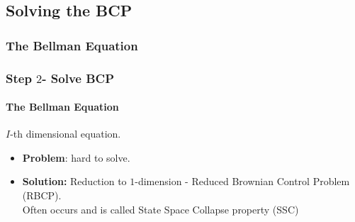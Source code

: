 \documentclass{beamer}
\begin{document}
\begin{frame}
{\begin{definition}
\begin{enumerate}
      \end{enumerate}
    \end{definition}
    
  }
  \vfill
\end{frame}
\subsection{Solving the BCP}

\subsubsection{The Bellman Equation}
\begin{frame}
  \frametitle{Step $2$- Solve BCP}
  \framesubtitle{The Bellman Equation}
  \vfill
  $I$-th dimensional equation.
  \vfill
  \pause
  \begin{itemize}[<+->]
  \item  {\bf Problem}: hard to solve.
    \vfill
  \item {\bf Solution:} Reduction to $1$-dimension - Reduced Brownian Control Problem (RBCP).\\
    Often occurs and is called State Space Collapse property (SSC)
  \end{itemize}
  \vfill

\end{frame}
\end{document}

